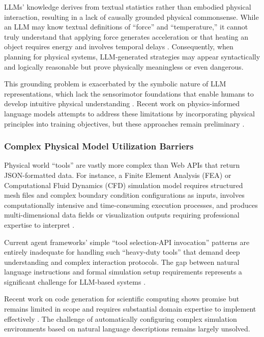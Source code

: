 LLMs' knowledge derives from textual statistics rather than embodied physical interaction, resulting in a lack of causally grounded physical commonsense. While an LLM may know textual definitions of ``force'' and ``temperature,'' it cannot truly understand that applying force generates acceleration or that heating an object requires energy and involves temporal delays \cite{bisk2020experience}. Consequently, when planning for physical systems, LLM-generated strategies may appear syntactically and logically reasonable but prove physically meaningless or even dangerous.

This grounding problem is exacerbated by the symbolic nature of LLM representations, which lack the sensorimotor foundations that enable humans to develop intuitive physical understanding \cite{harnad1990symbol}. Recent work on physics-informed language models attempts to address these limitations by incorporating physical principles into training objectives, but these approaches remain preliminary \cite{lu2021physics}.

\subsubsection{Complex Physical Model Utilization Barriers}

Physical world ``tools'' are vastly more complex than Web APIs that return JSON-formatted data. For instance, a Finite Element Analysis (FEA) or Computational Fluid Dynamics (CFD) simulation model requires structured mesh files and complex boundary condition configurations as inputs, involves computationally intensive and time-consuming execution processes, and produces multi-dimensional data fields or visualization outputs requiring professional expertise to interpret \cite{hughes2012finite}.

Current agent frameworks' simple ``tool selection-API invocation'' patterns are entirely inadequate for handling such ``heavy-duty tools'' that demand deep understanding and complex interaction protocols. The gap between natural language instructions and formal simulation setup requirements represents a significant challenge for LLM-based systems \cite{li2023apibank}.

Recent work on code generation for scientific computing shows promise but remains limited in scope and requires substantial domain expertise to implement effectively \cite{chen2021evaluating}. The challenge of automatically configuring complex simulation environments based on natural language descriptions remains largely unsolved.

